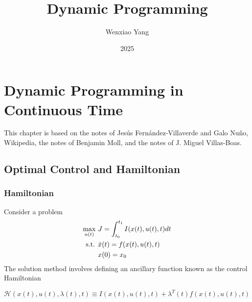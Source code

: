 \documentclass[11pt]{elegantbook}
\title{Dynamic Programming}
\author{Wenxiao Yang}
\institute{Haas School of Business, University of California Berkeley}
\date{2025}
\begin{document}
\maketitle

\frontmatter
\tableofcontents

\mainmatter

\chapter{Dynamic Programming in Continuous Time}
This chapter is based on the notes of Jesús Fernández-Villaverde and Galo Nuño, Wikipedia, the notes of Benjamin Moll, and the notes of J. Miguel Villas-Boas.

\section{Optimal Control and Hamiltonian}
\subsection{Hamiltonian}
Consider a problem
\begin{equation}
    \begin{aligned}
        \max_{u(t)}\ &J=\int_{t_0}^{t_1}I(x(t),u(t),t)dt\\
        \textnormal{s.t. }&\dot{x}(t)=f(x(t),u(t),t)\\
        &x(0)=x_0
    \end{aligned}
    \nonumber
\end{equation}
The solution method involves defining an ancillary function known as the control Hamiltonian
\begin{definition}[Hamiltonian]
    $\mathcal{H}(x(t),u(t),\lambda(t),t)\equiv I(x(t),u(t),t)+\lambda^T(t)f(x(t),u(t),t)$
\end{definition}
\end{document}

